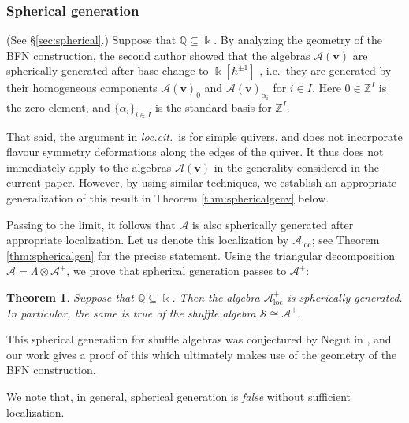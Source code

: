 \documentclass[11pt,reqno]{amsart}
\renewcommand{\mathbf}{\mathbold}
\numberwithin{equation}{section}
\newtheorem{Theorem}[equation]{Theorem}
\theoremstyle{definition}
\newcommand{\cA}{\mathcal{A}}
\newcommand{\cS}{\mathcal{S}}
\newcommand{\bv}{\mathbf{v}}
\newcommand{\QQ}{\mathbb{Q}}
\newcommand{\ZZ}{\mathbb{Z}}
\newcommand{\kk}{\Bbbk}
\renewcommand{\bv}{\mathbf{v}} %
\newcommand{\loc}{\mathrm{loc}} %
\newcommand{\vertexset}{I}
\newcommand{\qzast}{\cA}
\newcommand{\qzastplus}{\cA^{+}}
\newcommand{\shu}{\cS}
\begin{document}
\subsubsection{Spherical generation}
(See \S \ref{sec:spherical}.)
Suppose that $\QQ \subseteq \kk$.  By analyzing the geometry of the BFN construction, the second author showed that the algebras $\qzast(\bv)$ are spherically generated after base change to $\kk[\hbar^{\pm 1}]$ \cite[\S 3]{Weekes}, i.e.~they are generated by their homogeneous components $\qzast(\bv)_0$ and $\qzast(\bv)_{\alpha_i}$ for $i \in \vertexset$. Here $0\in\ZZ^\vertexset$ is the zero element, and $\{\alpha_i \}_{i \in \vertexset}$ is the standard basis for $ \ZZ^\vertexset$. 

That said, the argument in \emph{loc.cit.}~is for simple quivers, and does not incorporate flavour symmetry deformations along the edges of the quiver. It thus does not immediately apply to the algebras $\qzast(\bv)$ in the generality considered in the current paper.  However, by using similar techniques, we establish an appropriate generalization of this result  in Theorem \ref{thm:sphericalgenv} below. 

Passing to the limit, it follows that $\qzast$ is also spherically generated after appropriate localization. Let us denote this localization by $\qzast_\loc$; see Theorem \ref{thm:sphericalgen} for the precise statement.  Using the triangular decomposition $\cA = \Lambda \otimes \qzastplus$, we prove that spherical generation passes to  $\qzastplus$:

\begin{Theorem}
Suppose that $\QQ \subseteq \kk$. Then the algebra $\qzastplus_\loc$ is spherically generated.  In particular, the same is true of the shuffle algebra $\shu \cong \qzastplus$.
\end{Theorem}

This spherical generation for shuffle algebras was conjectured by Negut in \cite[Conjecture 2.12]{Negut-2025}, and our work gives a proof of this which ultimately makes use of the geometry of the BFN construction. 

We note that, in general,  spherical generation is \emph{false} without sufficient localization. 

\end{document}
